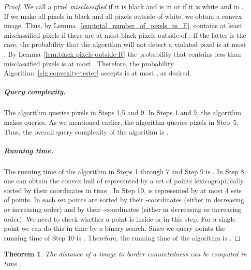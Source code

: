 \documentclass[11pt,english]{article}
\newtheorem{theorem}{Theorem}[section]
\numberwithin{figure}{section}
\begin{document}
\begin{proof}
We call a pixel {\em misclassified} if it is black and is in  or if it is white and in .
If we make all pixels in  black and all pixels outside of  white, we obtain a
convex image. Thus, by Lemma~\ref{lem:total_number_of_pixels_in_F},
 contains at least  misclassified pixels if there are
at most  black pixels outside of . If the latter is the
case, the probability that the algorithm will not detect a violated pixel
is at most . By
Lemma~\ref{lem:black-pixels-outside-R} the probability that 
contains less than  misclassified pixels is at most
.
Therefore, the probability Algorithm~\ref{alg:convexity-tester} accepts is at most
, as desired.
\subparagraph{Query complexity.} The algorithm queries pixels in Steps 1,5 and 9.
In Steps 1 and 9, the algorithm makes  queries. As we mentioned earlier, the
algorithm queries  pixels in Step~5. Thus, the overall query
complexity of the algorithm is .

\subparagraph{Running time.} The running time of the algorithm in Steps 1 through
7 and Step 9 is . In Step 8, one can
obtain the convex hull of  represented by a set of
 points lexicographically sorted by their coordinates
in time . In Step 10,  is represented
by at most 4 sets of  points. In each set points are sorted
by their -coordinates (either in decreasing or increasing order) and by
their -coordinates (either in decreasing or increasing order).
We need to check whether a point is inside  or  in this step. For a single point we can do
this in time  by a
binary search. Since we query  points the running
time of Step 10 is . Therefore, the running time
of the algorithm is .
\end{proof}
\begin{theorem}\label{thm:border-con}
The distance of a  image  to border connectedness can be computed
in time .
\end{theorem}
\end{document}
